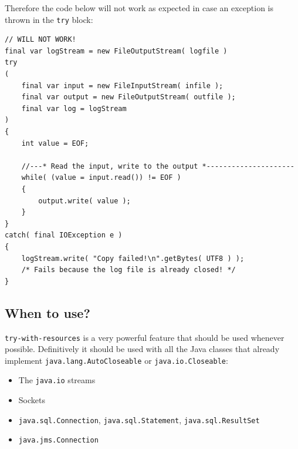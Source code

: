 \documentclass[12pt,a4paper,titlepage, parskip=half, headsepline, footsepline, cleardoubleplain]{scrbook}
\begin{document}
Therefore the code below will not work as expected in case an exception is thrown in the \lstinline|try| block:
\begin{lstlisting}
// WILL NOT WORK!
final var logStream = new FileOutputStream( logfile )
try
(   
    final var input = new FileInputStream( infile );
    final var output = new FileOutputStream( outfile );
    final var log = logStream 
)
{
	int value = EOF;
	
    //---* Read the input, write to the output *---------------------
    while( (value = input.read()) != EOF )
    {
        output.write( value );
    }
}
catch( final IOException e )
{
    logStream.write( "Copy failed!\n".getBytes( UTF8 ) );
    /* Fails because the log file is already closed! */
}
\end{lstlisting}

\subsection{When to use?}
\lstinline|try-with-resources| is a very powerful feature that should be used whenever possible. Definitively it should be used with all the Java classes that already implement \lstinline|java.lang.AutoCloseable| or \lstinline|java.io.Closeable|:

\begin{itemize}
\item{The \lstinline|java.io| streams}
\item{Sockets}
\item{\lstinline|java.sql.Connection|, \lstinline|java.sql.Statement|, \lstinline|java.sql.ResultSet|}
\item{\lstinline|java.jms.Connection|}
\end{itemize}
\end{document}
